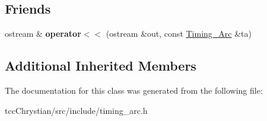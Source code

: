 \subsection*{Friends}
\begin{DoxyCompactItemize}
\item 
\hypertarget{classTiming__Analysis_1_1Timing__Arc_ae33a875fefadb96a5cdf5a17791c4d24}{ostream \& {\bfseries operator$<$$<$} (ostream \&out, const \hyperlink{classTiming__Analysis_1_1Timing__Arc}{Timing\-\_\-\-Arc} \&ta)}\label{classTiming__Analysis_1_1Timing__Arc_ae33a875fefadb96a5cdf5a17791c4d24}

\end{DoxyCompactItemize}
\subsection*{Additional Inherited Members}


The documentation for this class was generated from the following file\-:\begin{DoxyCompactItemize}
\item 
tcc\-Chrystian/src/include/timing\-\_\-arc.\-h\end{DoxyCompactItemize}
